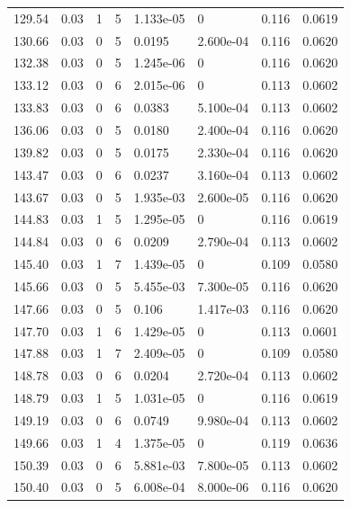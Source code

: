 \documentclass[preview]{standalone}
\begin{document}
{{{\begin{tabular}{L{1.2cm}C{1.2cm} C{0.3cm}C{0.5cm} C{1.4cm}C{1.4cm} C{1.4cm}C{1.4cm}}
  129.54  &  0.03  & 1     &  5 &  1.133e-05  & 0  & 0.116 &  0.0619   \\ 
  130.66  &  0.03  & 0     &  5 &  0.0195  & 2.600e-04  & 0.116 &  0.0620   \\ 
  132.38  &  0.03  & 0     &  5 &  1.245e-06  & 0  & 0.116 &  0.0620   \\ 
  133.12  &  0.03  & 0     &  6 &  2.015e-06  & 0  & 0.113 &  0.0602   \\ 
  133.83  &  0.03  & 0     &  6 &  0.0383  & 5.100e-04  & 0.113 &  0.0602   \\ 
  136.06  &  0.03  & 0     &  5 &  0.0180  & 2.400e-04  & 0.116 &  0.0620   \\ 
  139.82  &  0.03  & 0     &  5 &  0.0175  & 2.330e-04  & 0.116 &  0.0620   \\ 
  143.47  &  0.03  & 0     &  6 &  0.0237  & 3.160e-04  & 0.113 &  0.0602   \\ 
  143.67  &  0.03  & 0     &  5 &  1.935e-03  & 2.600e-05  & 0.116 &  0.0620   \\ 
  144.83  &  0.03  & 1     &  5 &  1.295e-05  & 0  & 0.116 &  0.0619   \\ 
  144.84  &  0.03  & 0     &  6 &  0.0209  & 2.790e-04  & 0.113 &  0.0602   \\ 
  145.40  &  0.03  & 1     &  7 &  1.439e-05  & 0  & 0.109 &  0.0580   \\ 
  145.66  &  0.03  & 0     &  5 &  5.455e-03  & 7.300e-05  & 0.116 &  0.0620   \\ 
  147.66  &  0.03  & 0     &  5 &  0.106  & 1.417e-03  & 0.116 &  0.0620   \\ 
  147.70  &  0.03  & 1     &  6 &  1.429e-05  & 0  & 0.113 &  0.0601   \\ 
  147.88  &  0.03  & 1     &  7 &  2.409e-05  & 0  & 0.109 &  0.0580   \\ 
  148.78  &  0.03  & 0     &  6 &  0.0204  & 2.720e-04  & 0.113 &  0.0602   \\ 
  148.79  &  0.03  & 1     &  5 &  1.031e-05  & 0  & 0.116 &  0.0619   \\ 
  149.19  &  0.03  & 0     &  6 &  0.0749  & 9.980e-04  & 0.113 &  0.0602   \\ 
  149.66  &  0.03  & 1     &  4 &  1.375e-05  & 0  & 0.119 &  0.0636   \\ 
  150.39  &  0.03  & 0     &  6 &  5.881e-03  & 7.800e-05  & 0.113 &  0.0602   \\ 
  150.40  &  0.03  & 0     &  5 &  6.008e-04  & 8.000e-06  & 0.116 &  0.0620   \\ 

\end{tabular}}}}
\end{document}
